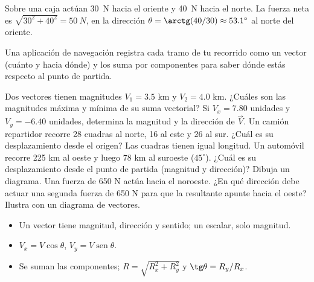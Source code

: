 \documentclass[11pt]{article}
\begin{document}
\begin{ejemplo}
Sobre una caja actúan \qty{30}{N} hacia el oriente y \qty{40}{N} hacia el norte. La fuerza
neta es $\sqrt{30^2 + 40^2} = \qty{50}{N}$, en la dirección $\theta = \arctg(40/30) \approx
\ang{53,1}$ al norte del oriente.
\begin{center}
\end{center}
\end{ejemplo}

\begin{aplicacion}
Una aplicación de navegación registra cada tramo de tu recorrido como un vector (cuánto y
hacia dónde) y los suma por componentes para saber dónde estás respecto al punto de partida.
\end{aplicacion}

\begin{preguntas}
\pregunta Dos vectores tienen magnitudes $V_1 = \num{3,5}$ km y $V_2 = \num{4,0}$ km. ¿Cuáles son
las magnitudes máxima y mínima de su suma vectorial?
\espacio{2cm}
\pregunta Si $V_x = \num{7,80}$ unidades y $V_y = -\num{6,40}$ unidades, determina la magnitud
y la dirección de $\vec V$.
\espacio{2.5cm}
\pregunta Un camión repartidor recorre 28 cuadras al norte, 16 al este y 26 al sur. ¿Cuál es
su desplazamiento desde el origen? Las cuadras tienen igual longitud.
\espacio{3cm}
\pregunta Un automóvil recorre 225 km al oeste y luego 78 km al suroeste ($45^\circ$). ¿Cuál es
su desplazamiento desde el punto de partida (magnitud y dirección)? Dibuja un diagrama.
\espacio{3.5cm}
\pregunta Una fuerza de 650 N actúa hacia el noroeste. ¿En qué dirección debe actuar una
segunda fuerza de 650 N para que la resultante apunte hacia el oeste? Ilustra con un diagrama
de vectores.
\espacio{3.5cm}
\end{preguntas}

\begin{resumen}
\begin{itemize}
  \item Un vector tiene magnitud, dirección y sentido; un escalar, solo magnitud.
  \item $V_x = V\cos\theta$, $V_y = V\operatorname{sen}\theta$.
  \item Se suman las componentes; $R = \sqrt{R_x^2+R_y^2}$ y $\tg\theta = R_y/R_x$.
\end{itemize}
\end{resumen}
\end{document}

